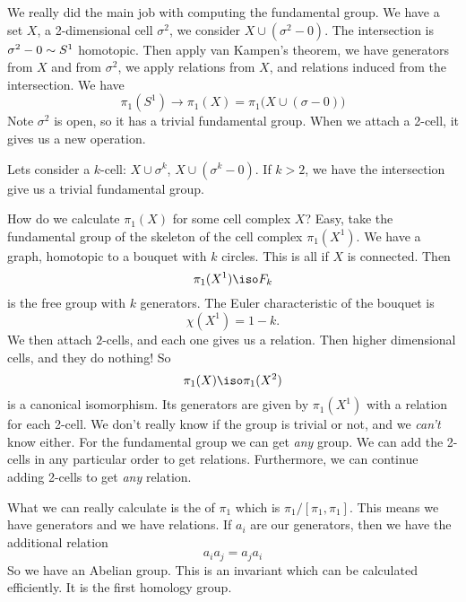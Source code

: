 We really did the main job with computing the fundamental
group. We have a set $X$, a 2-dimensional cell $\sigma^2$, we
consider
$X\cup(\sigma^2-0)$.
The intersection is $\sigma^2-0\sim S^1$ homotopic. Then
apply van Kampen's theorem, we have generators from $X$ and from
$\sigma^2$, we apply relations from $X$, and relations induced
from the intersection. We have
\begin{equation}
\pi_1(S^1)\to\pi_{1}(X)=\pi_1\bigl(X\cup(\sigma-0)\bigr)
\end{equation}
Note $\sigma^2$ is open, so it has a trivial fundamental
group. When we attach a 2-cell, it gives us a new operation.

Lets consider a $k$-cell: $X\cup\sigma^k$,
$X\cup(\sigma^k-0)$. If $k>2$, we have the intersection give us a
trivial fundamental group. 

%
How do we calculate $\pi_1(X)$ for some cell complex $X$?
Easy, take the fundamental group of the skeleton of the cell
complex $\pi_1(X^1)$. We have a graph, homotopic to a bouquet
with $k$ circles. This is all if $X$ is connected. Then
\begin{equation}
\pi_1(X^1)\iso\freeGrp{k}
\end{equation}
is the free group with $k$ generators. The Euler characteristic
of the bouquet is
\begin{equation}
\chi(X^1)=1-k.
\end{equation}
We then attach $2$-cells, and each one gives us a relation. Then
higher dimensional cells, and they do nothing! So
\begin{equation}
\pi_{1}(X)\iso\pi_{1}(X^2)
\end{equation}
is a canonical isomorphism. Its generators are given by
$\pi_1(X^1)$ with a relation for each 2-cell. We don't really
know if the group is trivial or not, and we \emph{can't} know
either. For the fundamental group we can get \emph{any} group. We
can add the 2-cells in any particular order to get
relations. Furthermore, we can continue adding 2-cells to get
\emph{any} relation.

What we can really calculate is the
of $\pi_1$ which is $\pi_1/[\pi_1,\pi_1]$. This means we have
generators and we have relations. If $a_i$ are our generators,
then we have the additional relation
\begin{equation}
a_ia_j=a_ja_i
\end{equation}
So we have an Abelian group. This is an invariant which can be
calculated efficiently. It is the first homology
group.


